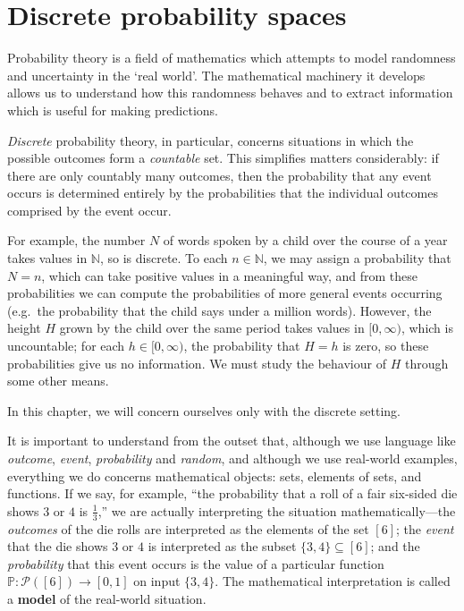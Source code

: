 \section{Discrete probability spaces}

Probability theory is a field of mathematics which attempts to model randomness and uncertainty in the `real world'. The mathematical machinery it develops allows us to understand how this randomness behaves and to extract information which is useful for making predictions.

\textit{Discrete} probability theory, in particular, concerns situations in which the possible outcomes form a \textit{countable} set. This simplifies matters considerably: if there are only countably many outcomes, then the probability that any event occurs is determined entirely by the probabilities that the individual outcomes comprised by the event occur.

For example, the number $N$ of words spoken by a child over the course of a year takes values in $\mathbb{N}$, so is discrete. To each $n \in \mathbb{N}$, we may assign a probability that $N=n$, which can take positive values in a meaningful way, and from these probabilities we can compute the probabilities of more general events occurring (e.g.\ the probability that the child says under a million words). However, the height $H$ grown by the child over the same period takes values in $[0,\infty)$, which is uncountable; for each $h \in [0,\infty)$, the probability that $H=h$ is zero, so these probabilities give us no information. We must study the behaviour of $H$ through some other means.

In this chapter, we will concern ourselves only with the discrete setting.

It is important to understand from the outset that, although we use language like \textit{outcome}, \textit{event}, \textit{probability} and \textit{random}, and although we use real-world examples, everything we do concerns mathematical objects: sets, elements of sets, and functions. If we say, for example, ``the probability that a roll of a fair six-sided die shows $3$ or $4$ is $\frac{1}{3}$,'' we are actually interpreting the situation mathematically---the \textit{outcomes} of the die rolls are interpreted as the elements of the set $[6]$; the \textit{event} that the die shows $3$ or $4$ is interpreted as the subset $\{ 3, 4 \} \subseteq [6]$; and the \textit{probability} that this event occurs is the value of a particular function $\mathbb{P} : \mathcal{P}([6]) \to [0,1]$ on input $\{ 3, 4 \}$. The mathematical interpretation is called a \textbf{model} of the real-world situation.

